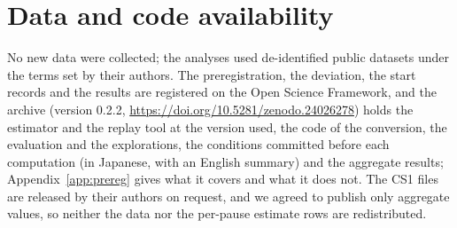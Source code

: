 \section*{Data and code availability}
\label{sec:availability}

No new data were collected; the analyses used de-identified public datasets under the terms set by their authors. The
preregistration, the deviation, the start records and the results are registered on the Open Science Framework, and the
archive (version 0.2.2, \url{https://doi.org/10.5281/zenodo.24026278}) holds the estimator and the replay tool at the version used, the code of the
conversion, the evaluation and the explorations, the conditions committed before each computation (in Japanese, with an
English summary) and the aggregate results; Appendix~\ref{app:prereg} gives what it covers and what it does not. The CS1
files are released by their authors on request, and we agreed to publish only aggregate values, so neither the data nor
the per-pause estimate rows are redistributed.
